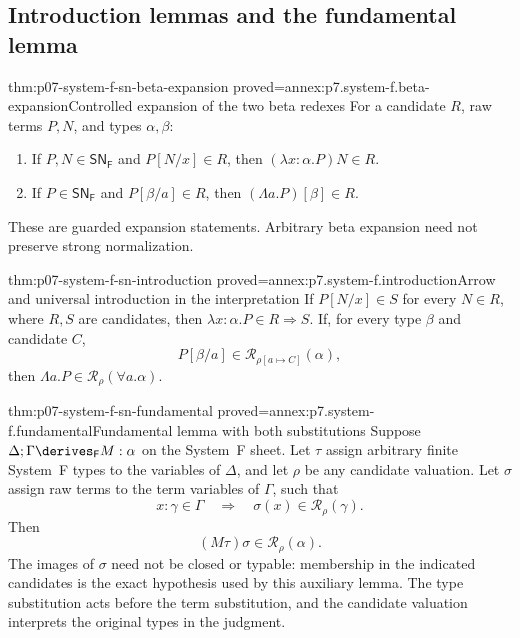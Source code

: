 \subsection{Introduction lemmas and the fundamental lemma}
\label{sec:p07-system-f-sn-fundamental}

\begin{hblemma}{thm:p07-system-f-sn-beta-expansion}
 {proved=annex:p7.system-f.beta-expansion}{Controlled expansion of the two beta redexes}
For a candidate \(R\), raw terms \(P,N\), and types \(\alpha,\beta\):
\begin{enumerate}
\item If \(P,N\in\mathsf{SN}_{\mathsf F}\) and \(P[N/x]\in R\),
      then \((\lambda x{:}\alpha.P)N\in R\).
\item If \(P\in\mathsf{SN}_{\mathsf F}\) and \(P[\beta/a]\in R\),
      then \((\Lambda a.P)[\beta]\in R\).
\end{enumerate}
These are guarded expansion statements. Arbitrary beta expansion need
not preserve strong normalization.
\end{hblemma}

\begin{hblemma}{thm:p07-system-f-sn-introduction}
 {proved=annex:p7.system-f.introduction}{Arrow and universal introduction in the interpretation}
If \(P[N/x]\in S\) for every \(N\in R\), where \(R,S\) are
candidates, then \(\lambda x{:}\alpha.P\in R\Rightarrow S\).
If, for every type \(\beta\) and candidate \(C\),
\[
 P[\beta/a]\in\mathcal R_{\rho[a\mapsto C]}(\alpha),
\]
then \(\Lambda a.P\in\mathcal R_\rho(\forall a.\alpha)\).
\end{hblemma}

\begin{hbtheorem}{thm:p07-system-f-sn-fundamental}
 {proved=annex:p7.system-f.fundamental}{Fundamental lemma with both substitutions}
Suppose \(\Delta;\Gamma\derives_{\mathsf F}M:\alpha\) on the
System~F sheet. Let \(\tau\) assign arbitrary finite System~F types
to the variables of \(\Delta\), and let \(\rho\) be any candidate
valuation. Let \(\sigma\) assign raw terms to the term variables of
\(\Gamma\), such that
\[
 x:\gamma\in\Gamma\quad\Longrightarrow\quad
              \sigma(x)\in\mathcal R_\rho(\gamma).
\]
Then
\[
             (M\tau)\sigma\in\mathcal R_\rho(\alpha).
\]
The images of \(\sigma\) need not be closed or typable: membership
in the indicated candidates is the exact hypothesis used by this
auxiliary lemma. The type substitution acts before the term substitution,
and the candidate valuation interprets the original types in the judgment.
\end{hbtheorem}

